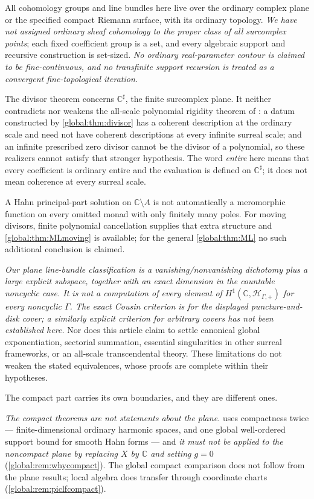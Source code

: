\documentclass[11pt,letterpaper]{article}
\theoremstyle{definition}
\theoremstyle{remark}
\newcommand{\C}{\mathbb C}
\newcommand{\HP}{\mathscr H_{\Gamma,+}}
\newcommand{\sh}{^{\sharp}}
\numberwithin{equation}{section}
\begin{document}
All cohomology groups and line bundles here live over the ordinary complex plane or the specified compact Riemann surface, with its ordinary topology. \emph{We have not assigned ordinary sheaf cohomology to the proper class of all surcomplex points}; each fixed coefficient group is a set, and every algebraic support and recursive construction is set-sized. \emph{No ordinary real-parameter contour is claimed to be fine-continuous, and no transfinite support recursion is treated as a convergent fine-topological iteration.}

The divisor theorem concerns $\C\sh$, the finite surcomplex plane. It neither contradicts nor weakens the all-scale polynomial rigidity theorem of \cite[\S12]{Source}: a datum constructed by \cref{global:thm:divisor} has a coherent description at the ordinary scale and need not have coherent descriptions at every infinite surreal scale; and an infinite prescribed zero divisor cannot be the divisor of a polynomial, so these realizers cannot satisfy that stronger hypothesis. The word \emph{entire} here means that every coefficient is ordinary entire and the evaluation is defined on $\C\sh$; it does not mean coherence at every surreal scale.

A Hahn principal-part solution on $\C\setminus A$ is not automatically a meromorphic function on every omitted monad with only finitely many poles. For moving divisors, finite polynomial cancellation supplies that extra structure and \cref{global:thm:MLmoving} is available; for the general \cref{global:thm:ML} no such additional conclusion is claimed.

\emph{Our plane line-bundle classification is a vanishing/nonvanishing dichotomy plus a large explicit subspace, together with an exact dimension in the countable noncyclic case. It is not a computation of every element of $H^1(\C,\HP)$ for every noncyclic $\Gamma$. The exact Cousin criterion is for the displayed puncture-and-disk cover; a similarly explicit criterion for arbitrary covers has not been established here.} Nor does this article claim to settle canonical global exponentiation, sectorial summation, essential singularities in other surreal frameworks, or an all-scale transcendental theory. These limitations do not weaken the stated equivalences, whose proofs are complete within their hypotheses.

The compact part carries its own boundaries, and they are different ones.

\emph{The compact theorems are not statements about the plane.}  uses compactness twice --- finite-dimensional ordinary harmonic spaces, and one global well-ordered support bound for smooth Hahn forms --- and \emph{it must not be applied to the noncompact plane by replacing $X$ by $\C$ and setting $g=0$} (\cref{global:rem:whycompact}). The global compact comparison does not follow from the plane results; local algebra does transfer through coordinate charts (\cref{global:rem:piclfcompact}).
\end{document}
